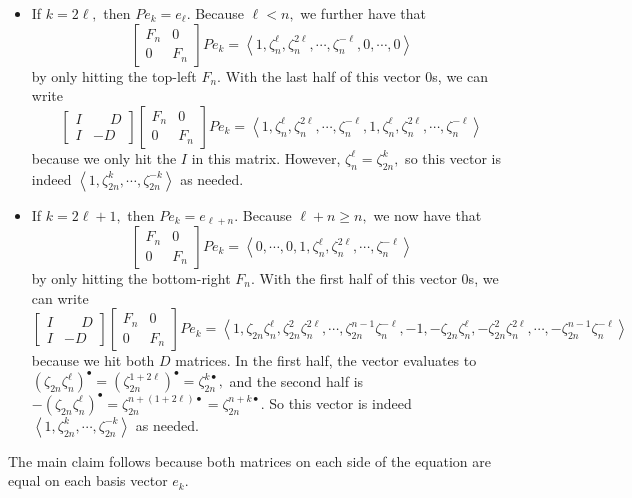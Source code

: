 \begin{itemize}
    \item If $k=2\ell,$ then $Pe_k=e_\ell.$ Because $\ell<n,$ we further have that
    \[\begin{bmatrix}
        F_n & 0 \\
        0 & F_n
    \end{bmatrix}Pe_k=\left\langle1,\zeta_n^\ell,\zeta_n^{2\ell},\cdots,\zeta_n^{-\ell},0,\cdots,0\right\rangle\]
    by only hitting the top-left $F_n.$ With the last half of this vector $0$s, we can write
    \[\begin{bmatrix}
        I & \phantom-D \\
        I & -D
    \end{bmatrix}\begin{bmatrix}
        F_n & 0 \\
        0 & F_n
    \end{bmatrix}Pe_k=\left\langle1,\zeta_n^\ell,\zeta_n^{2\ell},\cdots,\zeta_n^{-\ell},1,\zeta_n^\ell,\zeta_n^{2\ell},\cdots,\zeta_n^{-\ell}\right\rangle\]
    because we only hit the $I$ in this matrix. However, $\zeta_n^\ell=\zeta_{2n}^k,$ so this vector is indeed $\left\langle1,\zeta_{2n}^k,\cdots,\zeta_{2n}^{-k}\right\rangle$ as needed.
    
    \item If $k=2\ell+1,$ then $Pe_k=e_{\ell+n}.$ Because $\ell+n\ge n,$ we now have that
    \[\begin{bmatrix}
        F_n & 0 \\
        0 & F_n
    \end{bmatrix}Pe_k=\left\langle0,\cdots,0,1,\zeta_n^\ell,\zeta_n^{2\ell},\cdots,\zeta_n^{-\ell}\right\rangle\]
    by only hitting the bottom-right $F_n.$ With the first half of this vector $0$s, we can write
    \[\begin{bmatrix}
        I & \phantom-D \\
        I & -D
    \end{bmatrix}\begin{bmatrix}
        F_n & 0 \\
        0 & F_n
    \end{bmatrix}Pe_k=\left\langle1,\zeta_{2n}\zeta_n^\ell,\zeta_{2n}^2\zeta_n^{2\ell},\cdots,\zeta_{2n}^{n-1}\zeta_n^{-\ell},-1,-\zeta_{2n}\zeta_n^\ell,-\zeta_{2n}^2\zeta_n^{2\ell},\cdots,-\zeta_{2n}^{n-1}\zeta_n^{-\ell}\right\rangle\]
    because we hit both $D$ matrices. In the first half, the vector evaluates to $\left(\zeta_{2n}\zeta_n^\ell\right)^\bullet=\left(\zeta_{2n}^{1+2\ell}\right)^\bullet=\zeta_{2n}^{k\bullet},$ and the second half is $-\left(\zeta_{2n}\zeta_n^\ell\right)^\bullet=\zeta_{2n}^{n+(1+2\ell)\bullet}=\zeta_{2n}^{n+k\bullet}.$ So this vector is indeed $\left\langle1,\zeta_{2n}^k,\cdots,\zeta_{2n}^{-k}\right\rangle$ as needed.
\end{itemize}
The main claim follows because both matrices on each side of the equation are equal on each basis vector $e_k.$

